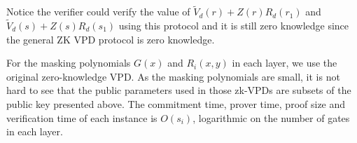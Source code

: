 Notice the verifier could verify the value of $\tilde{V}_d(r) + Z(r)R_d(r_1)$ and $\tilde{V}_d(s) + Z(s)R_d(s_1)$ using this protocol and it is still zero knowledge since the general ZK VPD protocol is zero knowledge. 

For the masking polynomials $G(x)$ and $R_i(x,y)$ in each layer, we use the original zero-knowledge VPD. As the masking polynomials are small, it is not hard to see that the public parameters used in those zk-VPDs are subsets of the public key presented above. The commitment time, prover time, proof size and verification time of each instance is $O(s_i)$, logarithmic on the number of gates in each layer. 









